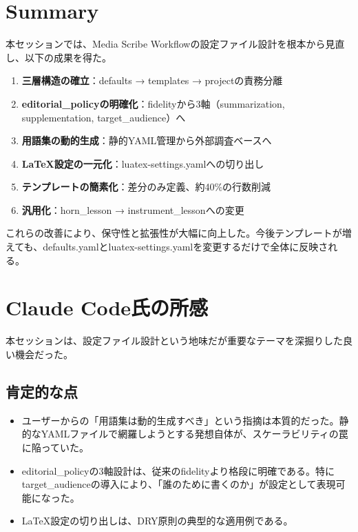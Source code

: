 \documentclass[a4paper,10pt,twocolumn]{ltjsarticle}
\begin{document}
\section{Summary}

本セッションでは、Media Scribe Workflowの設定ファイル設計を根本から見直し、以下の成果を得た。

\begin{enumerate}[noitemsep]
    \item \textbf{三層構造の確立}：defaults → templates → projectの責務分離
    \item \textbf{editorial\_policyの明確化}：fidelityから3軸（summarization, supplementation, target\_audience）へ
    \item \textbf{用語集の動的生成}：静的YAML管理から外部調査ベースへ
    \item \textbf{LaTeX設定の一元化}：luatex-settings.yamlへの切り出し
    \item \textbf{テンプレートの簡素化}：差分のみ定義、約40\%の行数削減
    \item \textbf{汎用化}：horn\_lesson → instrument\_lessonへの変更
\end{enumerate}

これらの改善により、保守性と拡張性が大幅に向上した。今後テンプレートが増えても、defaults.yamlとluatex-settings.yamlを変更するだけで全体に反映される。

\section{Claude Code氏の所感}

本セッションは、設定ファイル設計という地味だが重要なテーマを深掘りした良い機会だった。

\subsection{肯定的な点}

\begin{itemize}[noitemsep]
    \item ユーザーからの「用語集は動的生成すべき」という指摘は本質的だった。静的なYAMLファイルで網羅しようとする発想自体が、スケーラビリティの罠に陥っていた。
    \item editorial\_policyの3軸設計は、従来のfidelityより格段に明確である。特にtarget\_audienceの導入により、「誰のために書くのか」が設定として表現可能になった。
    \item LaTeX設定の切り出しは、DRY原則の典型的な適用例である。
\end{itemize}
\end{document}
